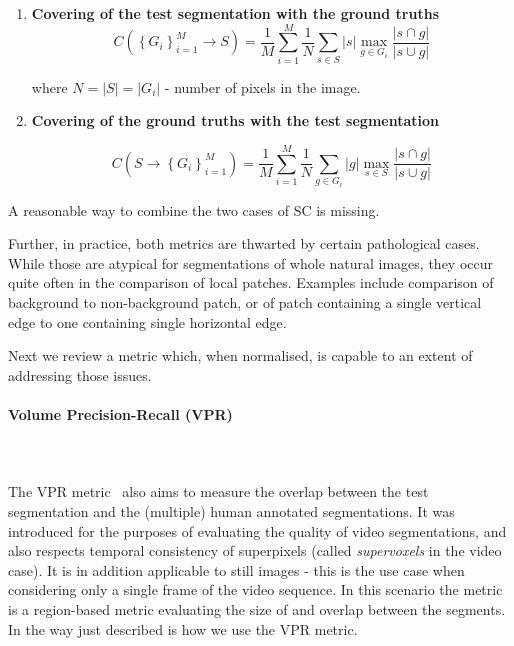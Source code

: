 \begin{enumerate}
\item{\textbf{Covering of the test segmentation with the ground truths}}
\begin{equation}
C\left(\left\{ {G_{i}}\right\} _{i=1}^{M}\longrightarrow S\right)=\frac{1}{M}\sum\limits _{i=1}^{M}\frac{1}{N}\sum\limits _{s\in S}\left|s\right|\max_{g\in G_{i}}\frac{\left|s\cap g\right|}{\left|s\cup g\right|}
\end{equation}

where $N=\left|S\right|=\left|G_{i}\right|$ - number of pixels in the image.

\item{\textbf{Covering of the ground truths with the test segmentation}}

\begin{equation}
C\left(S\longrightarrow\left\{ {G_{i}}\right\} _{i=1}^{M}\right)=\frac{1}{M}\sum\limits _{i=1}^{M}\frac{1}{N}\sum\limits _{g\in G_{i}}\left|g\right|\max_{s\in S}\frac{\left|s\cap g\right|}{\left|s\cup g\right|}
\end{equation}
\end{enumerate}
A reasonable %
way to combine the two cases of SC is missing.

Further, in practice, both metrics are thwarted by certain pathological cases. While those are atypical for segmentations of whole natural images, they occur quite often in the comparison of local patches. Examples include comparison of background to non-background patch, or of patch containing a single vertical edge to one containing single horizontal edge. 

Next we review a metric which, when normalised, is capable to an extent of addressing those issues.

\paragraph{Volume Precision-Recall (VPR)}\mbox{}\\\mbox{}\\
\label{par:ch4-VPR-maths}
The VPR metric~\cite{Galasso13} also aims to measure the overlap between the test segmentation and the (multiple) human annotated segmentations. It was introduced for the purposes of evaluating the quality of video segmentations, and also respects temporal consistency of superpixels (called \textit{supervoxels} in the video case). It is in addition applicable to %
still images - this is the use case when considering only a single frame of the video sequence. In this scenario the metric is a region-based metric evaluating the size of and overlap between the segments. 
In the way just described is how we use the VPR metric.

